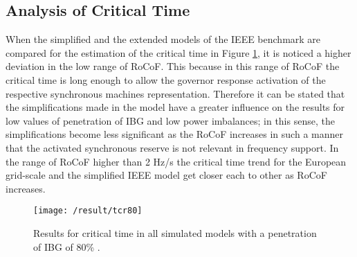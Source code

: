 
\subsection{Analysis of Critical Time}


When the simplified and the extended models of the IEEE benchmark are compared for the estimation of the critical time in Figure \ref{fig:res_tcr}, it is noticed a higher deviation in the low range of RoCoF. This because in this range of RoCoF the critical time is long enough to allow the governor response activation of the respective synchronous machines representation. Therefore it can be stated that the simplifications made in the model have a greater influence on the results for low values of penetration of IBG and low power imbalances; in this sense, the simplifications become less significant as the RoCoF increases in such a manner that the activated synchronous reserve is not relevant in frequency support. In the range of RoCoF higher than 2 Hz/s the critical time trend for the European grid-scale and the simplified IEEE model get closer each to other as RoCoF increases.

\begin{figure}[h]
	\centering
	\texttt{[image: /result/tcr80]}
	\caption{Results for critical time in all simulated models with a penetration of IBG of 80\% .}
	\label{fig:res_tcr}
\end{figure}


